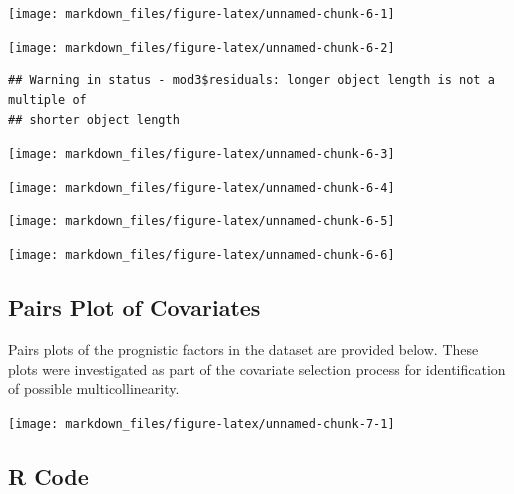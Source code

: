 \documentclass[
]{article}
\begin{document}
\begin{center}\texttt{[image: markdown\_files/figure-latex/unnamed-chunk-6-1]} \end{center}

\begin{center}\texttt{[image: markdown\_files/figure-latex/unnamed-chunk-6-2]} \end{center}

\begin{verbatim}
## Warning in status - mod3$residuals: longer object length is not a multiple of
## shorter object length
\end{verbatim}

\begin{center}\texttt{[image: markdown\_files/figure-latex/unnamed-chunk-6-3]} \end{center}

\begin{center}\texttt{[image: markdown\_files/figure-latex/unnamed-chunk-6-4]} \end{center}

\begin{center}\texttt{[image: markdown\_files/figure-latex/unnamed-chunk-6-5]} \end{center}

\begin{center}\texttt{[image: markdown\_files/figure-latex/unnamed-chunk-6-6]} \end{center}

\hypertarget{pairs-plot-of-covariates}{%
\subsection{Pairs Plot of Covariates}\label{pairs-plot-of-covariates}}

Pairs plots of the prognistic factors in the dataset are provided below.
These plots were investigated as part of the covariate selection process
for identification of possible multicollinearity.

\begin{center}\texttt{[image: markdown\_files/figure-latex/unnamed-chunk-7-1]} \end{center}

\newpage

\hypertarget{r-code}{%
\subsection{R Code}\label{r-code}}
\end{document}
